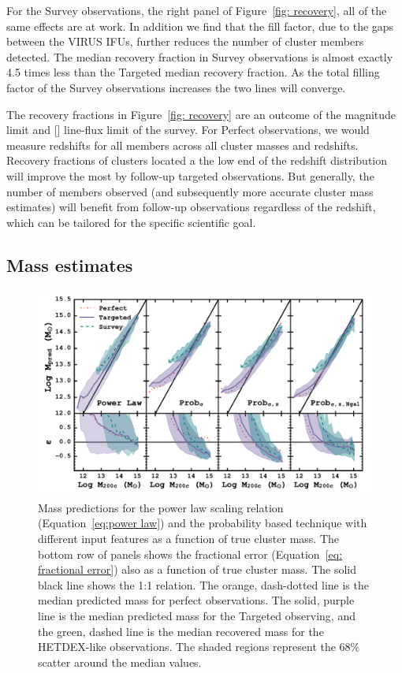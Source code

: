 \documentclass[fleqn,usenatbib]{mnras}
\begin{document}
For the Survey observations, the right panel of Figure~\ref{fig: recovery}, all of the same effects are at work. In addition we find that the fill factor, due to the gaps between the VIRUS IFUs, further reduces the number of cluster members detected. The median recovery fraction in Survey observations is almost exactly 4.5 times less than the Targeted median recovery fraction. As the total filling factor of the Survey observations increases the two lines will converge.

The recovery fractions in Figure~\ref{fig: recovery} are an outcome of the magnitude limit and [] line-flux limit of the survey. For Perfect observations, we would measure redshifts for all members across all cluster masses and redshifts. Recovery fractions of clusters located a the low end of the redshift distribution will improve the most by follow-up targeted observations. But generally, the number of members observed (and subsequently more accurate cluster mass estimates) will benefit from follow-up observations regardless of the redshift, which can be tailored for the specific scientific goal.

\subsection{Mass estimates}
\begin{figure} 
	\includegraphics[width=\textwidth]{figures/Probcomparison.pdf} 
	\caption[Probability based cluster mass predictions.]{Mass predictions for the power law scaling relation (Equation~\ref{eq:power law}) and the probability based technique with different input features as a function of true cluster mass. The bottom row of panels shows the fractional error (Equation~\ref{eq: fractional error}) also as a function of true cluster mass. The solid black line shows the 1:1 relation. The orange, dash-dotted line is the median predicted mass for perfect observations. The solid, purple line is the median predicted mass for the Targeted observing, and the green, dashed line is the median recovered mass for the HETDEX-like observations. The shaded regions represent the 68\% scatter around the median values.}
	\label{fig:Probability comparison} 
\end{figure}
\end{document}
